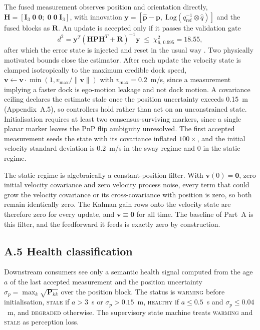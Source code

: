 The fused measurement observes position and orientation directly, $\mathbf{H} = [\mathbf{I}_3\; \mathbf{0}\; \mathbf{0};\; \mathbf{0}\; \mathbf{0}\; \mathbf{I}_3]$, with innovation $\mathbf{y} = [\hat{\mathbf{p}} - \mathbf{p},\; \mathrm{Log}(q_{\mathrm{ref}}^{-1} \otimes \hat{q})]$ and the fused blocks as $\mathbf{R}$. An update is accepted only if it passes the validation gate
\begin{equation}
    d^2 = \mathbf{y}^{T}\left(\mathbf{H}\mathbf{P}\mathbf{H}^{T} + \mathbf{R}\right)^{-1}\mathbf{y} \;\leq\; \chi^2_{6,\,0.995} = 18.55,
\end{equation}
after which the error state is injected and reset in the usual way \cite{sola2017quaternion}. Two physically motivated bounds close the estimator. After each update the velocity state is clamped isotropically to the maximum credible dock speed, $\mathbf{v} \leftarrow \mathbf{v} \cdot \min(1, v_{\max}/\|\mathbf{v}\|)$ with $v_{\max} = 0.2$~m/s, since a measurement implying a faster dock is ego-motion leakage and not dock motion. A covariance ceiling declares the estimate stale once the position uncertainty exceeds 0.15~m (Appendix~A.5), so controllers hold rather than act on an unconstrained state. Initialisation requires at least two consensus-surviving markers, since a single planar marker leaves the PnP flip ambiguity unresolved. The first accepted measurement seeds the state with its covariance inflated $100\times$, and the initial velocity standard deviation is $0.2$~m/s in the sway regime and $0$ in the static regime.

The static regime is algebraically a constant-position filter. With $\mathbf{v}(0) = \mathbf{0}$, zero initial velocity covariance and zero velocity process noise, every term that could grow the velocity covariance or its cross-covariance with position is zero, so both remain identically zero. The Kalman gain rows onto the velocity state are therefore zero for every update, and $\mathbf{v} \equiv \mathbf{0}$ for all time. The baseline of Part~A is this filter, and the feedforward it feeds is exactly zero by construction.

\subsection*{A.5 Health classification}

Downstream consumers see only a semantic health signal computed from the age $a$ of the last accepted measurement and the position uncertainty $\sigma_p = \max_k \sqrt{\mathbf{P}_{kk}}$ over the position block. The status is \textsc{warming} before initialisation, \textsc{stale} if $a > 3$~s or $\sigma_p > 0.15$~m, \textsc{healthy} if $a \leq 0.5$~s and $\sigma_p \leq 0.04$~m, and \textsc{degraded} otherwise. The supervisory state machine treats \textsc{warming} and \textsc{stale} as perception loss.

